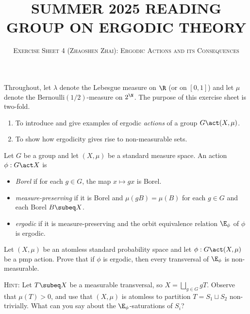 \documentclass[reqno, twoside]{article}
\begin{document}
    \title{\textbf{\normalsize\MakeUppercase{Summer 2025 Reading Group on Ergodic Theory}}}
    \author{\normalsize\textsc{Exercise Sheet 4 (Zhaoshen Zhai): Ergodic Actions and its Consequences}}
    \date{}
    \maketitle

    Throughout, let $\lambda$ denote the Lebesgue measure on $\R$ (or on $[0,1]$) and let $\mu$ denote the Bernoulli$(1/2)$-measure on $2^\N$. The purpose of this exercise sheet is two-fold.
    \begin{enumerate}
        \item To introduce and give examples of ergodic \textit{actions} of a group $G\act(X,\mu)$.
            \vspace{-0.05in}
        \item To show how ergodicity gives rise to non-measurable sets.
    \end{enumerate}

    \begin{definition*}
        Let $G$ be a group and let $(X,\mu)$ be a standard measure space. An action $\phi:G\act X$ is
        \begin{itemize}
            \item \textit{Borel} if for each $g\in G$, the map $x\mapsto gx$ is Borel.
                \vspace{-0.05in}
            \item \textit{measure-preserving} if it is Borel and $\mu(gB)=\mu(B)$ for each $g\in G$ and each Borel $B\subeq X$.
                \vspace{-0.05in}
            \item \textit{ergodic} if it is measure-preserving and the orbit equivalence relation $\E_\phi$ of $\phi$ is ergodic.
        \end{itemize}
    \end{definition*}

    \begin{exercise}\label{1}
        Let $(X,\mu)$ be an atomless standard probability space and let $\phi:G\act(X,\mu)$ be a pmp action. Prove that if $\phi$ is ergodic, then every transversal of $\E_\phi$ is non-measurable.

        \textsc{Hint}: Let $T\subeq X$ be a measurable transversal, so $X=\bigsqcup_{g\in G}gT$. Observe that $\mu(T)>0$, and use that $(X,\mu)$ is atomless to partition $T=S_1\sqcup S_2$ non-trivially. What can you say about the $\E_\phi$-saturations of $S_i$?
    \end{exercise}
\end{document}
